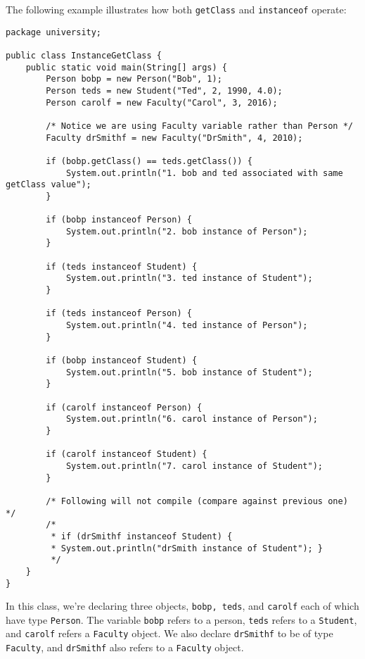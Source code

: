 The following example illustrates how both \verb!getClass! and \verb!instanceof! operate:


\begin{lstlisting}
package university;

public class InstanceGetClass {
	public static void main(String[] args) {
		Person bobp = new Person("Bob", 1);
		Person teds = new Student("Ted", 2, 1990, 4.0);
		Person carolf = new Faculty("Carol", 3, 2016);

		/* Notice we are using Faculty variable rather than Person */
		Faculty drSmithf = new Faculty("DrSmith", 4, 2010);

		if (bobp.getClass() == teds.getClass()) {
			System.out.println("1. bob and ted associated with same getClass value");
		}

		if (bobp instanceof Person) {
			System.out.println("2. bob instance of Person");
		}

		if (teds instanceof Student) {
			System.out.println("3. ted instance of Student");
  		}

		if (teds instanceof Person) {
			System.out.println("4. ted instance of Person");
		}

		if (bobp instanceof Student) {
			System.out.println("5. bob instance of Student");
		}

		if (carolf instanceof Person) {
			System.out.println("6. carol instance of Person");
		}

		if (carolf instanceof Student) {
			System.out.println("7. carol instance of Student");
		}

		/* Following will not compile (compare against previous one) */
		/*
		 * if (drSmithf instanceof Student) {
		 * System.out.println("drSmith instance of Student"); }
		 */
	}
}
\end{lstlisting}

In this class, we're declaring three objects, \verb!bobp, teds!, and \verb!carolf! each of which have type \verb!Person!. The variable \verb!bobp! refers to a person, \verb!teds! refers to a \verb!Student!, and \verb!carolf! refers a \verb!Faculty! object. We also declare \verb!drSmithf! to be of type \verb!Faculty!, and \verb!drSmithf! also refers to a \verb!Faculty! object.


